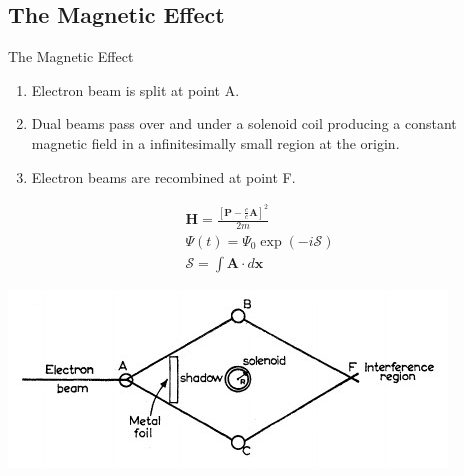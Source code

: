 \documentclass[9pt]{beamer}
\begin{document}
\subsection{The Magnetic Effect}
\begin{frame}{The Magnetic Effect}

  \begin{enumerate}
    \item Electron beam is split at point A.
    \item Dual beams pass over and under a solenoid coil producing a constant magnetic
      field in a infinitesimally small region at the origin.
    \item Electron beams are recombined at point F.
  \end{enumerate}

  \begin{minipage}{0.4\textwidth}
    \begin{align*}
      &\bm{H} = \frac{\left[ \bm{P} - \frac{e}{c}\bm{A} \right]^{2}}{2m} &\\
      &\Psi(t) = \Psi_{0} \exp(-i \mathcal{S}) &\\
      &\mathcal{S} = \int \bm{A} \cdot d\bm{x} &
    \end{align*}
  \end{minipage}
  \hspace{0.05\textwidth}
  \begin{minipage}{0.5\textwidth}
    \includegraphics[width=\textwidth]{magnetic_effect}
    \label{fig:AME}
  \end{minipage}

\end{frame}
\end{document}
